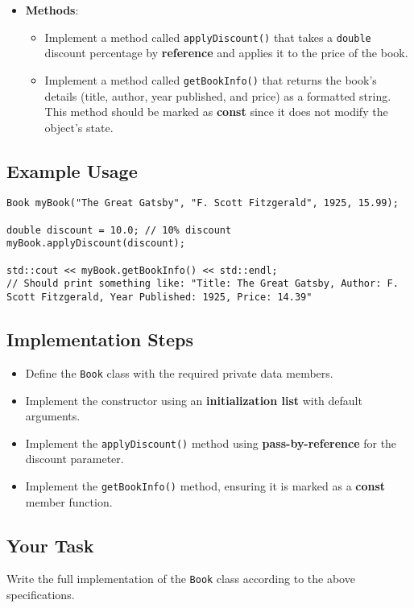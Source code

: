 \documentclass[a4paper]{article}
\begin{document}
\begin{itemize}
    \item \textbf{Methods}:
    \begin{itemize}
        \item Implement a method called \texttt{applyDiscount()} that takes a \texttt{double} discount percentage by \textbf{reference} and applies it to the price of the book.
        \item Implement a method called \texttt{getBookInfo()} that returns the book's details (title, author, year published, and price) as a formatted string. This method should be marked as \textbf{const} since it does not modify the object's state.
    \end{itemize}
\end{itemize}

\subsection*{Example Usage}

\begin{verbatim}
Book myBook("The Great Gatsby", "F. Scott Fitzgerald", 1925, 15.99);

double discount = 10.0; // 10% discount
myBook.applyDiscount(discount);

std::cout << myBook.getBookInfo() << std::endl;
// Should print something like: "Title: The Great Gatsby, Author: F. Scott Fitzgerald, Year Published: 1925, Price: 14.39"
\end{verbatim}

\subsection*{Implementation Steps}

\begin{itemize}
    \item Define the \texttt{Book} class with the required private data members.
    \item Implement the constructor using an \textbf{initialization list} with default arguments.
    \item Implement the \texttt{applyDiscount()} method using \textbf{pass-by-reference} for the discount parameter.
    \item Implement the \texttt{getBookInfo()} method, ensuring it is marked as a \textbf{const} member function.
\end{itemize}

\subsection*{Your Task}
Write the full implementation of the \texttt{Book} class according to the above specifications.
\newpage
\end{document}
